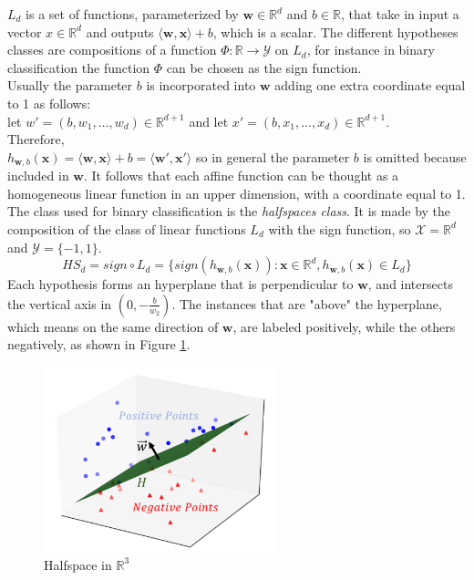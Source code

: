 $L_d$ is a set of functions, parameterized by $\mathbf{w} \in \mathbb{R}^d$ and $b \in \mathbb{R}$, that take in input a vector $x \in \mathbb{R}^d$ and outputs $\langle \textbf{w},\textbf{x} \rangle + b$, which is a scalar.
The different hypotheses classes are compositions of a function $\Phi : \mathbb{R} \rightarrow \mathcal{Y}$ on $L_d$, for instance in binary classification the function $\Phi$ can be chosen as the sign function.\\
Usually the parameter $b$ is incorporated into $\mathbf{w}$ adding one extra coordinate equal to 1 as follows:\\
let $w'=(b, w_1, \dots , w_d) \in \mathbb{R}^{d+1}$ and let $x'=(b, x_1, \dots , x_d) \in \mathbb{R}^{d+1}$.\\
Therefore, \\
$h_{\mathbf{w},b}(\mathbf{x}) = \langle \mathbf{w},\mathbf{x} \rangle + b = \langle \mathbf{w'},\mathbf{x'} \rangle$
so in general the parameter $b$ is omitted because included in $\mathbf{w}$. It follows that each affine function can be thought as a homogeneous linear function in an upper dimension, with a coordinate equal to 1.\\
The class used for binary classification is the \textit{halfspaces class}. It is made by the composition of the class of linear functions $L_d$ with the sign function, so $\mathcal{X}=\mathbb{R}^d$ and $\mathcal{Y}=\{-1,1\}$.
\[ HS_d = sign \circ L_d = \{ sign( h_{\mathbf{w},b}(\mathbf{x}) ) : \mathbf{x} \in \mathbb{R}^d, h_{\mathbf{w},b}(\mathbf{x}) \in L_d \} \]
Each hypothesis forms an hyperplane that is perpendicular to $\mathbf{w}$, and intersects the vertical axis in $(0, -\frac{b}{w_2})$. The instances that are "above" the hyperplane, which means on the same direction of $\mathbf{w}$, are labeled positively, while the others negatively, as shown in Figure \ref{fig:halfspace}.

\begin{figure}[ht]
	\centering
	\includegraphics[width=0.6\textwidth]{figures/halfspace.png}
	\caption{Halfspace in $\mathbb{R}^3$}
	\label{fig:halfspace}
\end{figure}










